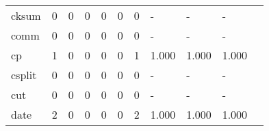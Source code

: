 \begin{longtable}{lp{1.20cm}p{1.20cm}p{1.20cm}p{1.20cm}p{1.20cm}p{1.20cm}p{1.20cm}p{1.20cm}p{1.20cm}p{1.20cm}}
cksum     &                                     0 &                                                  0 &                                                  0 &                                                  0 &                                                  0 &                                                  0 &                                             - &                                                  - &                                                  - \\
comm      &                                     0 &                                                  0 &                                                  0 &                                                  0 &                                                  0 &                                                  0 &                                             - &                                                  - &                                                  - \\
cp        &                                     1 &                                                  0 &                                                  0 &                                                  0 &                                                  0 &                                                  1 &                                         1.000 &                                              1.000 &                                              1.000 \\
csplit    &                                     0 &                                                  0 &                                                  0 &                                                  0 &                                                  0 &                                                  0 &                                             - &                                                  - &                                                  - \\
cut       &                                     0 &                                                  0 &                                                  0 &                                                  0 &                                                  0 &                                                  0 &                                             - &                                                  - &                                                  - \\
date      &                                     2 &                                                  0 &                                                  0 &                                                  0 &                                                  0 &                                                  2 &                                         1.000 &                                              1.000 &                                              1.000 \\

\end{longtable}
